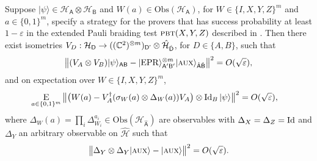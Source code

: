 \documentclass{toc}
\newcommand{\ket}[1]{|#1\rangle}
\newcommand{\Id}{\ensuremath{\mathop{\rm Id}\nolimits}}
\newcommand{\Es}[1]{\ensuremath{\mathop{\textsc{E}}}_{#1}} %
\newcommand{\setft}[1]{\mathrm{#1}}
\newcommand{\Obs}{\setft{Obs}}
\newcommand{\reg}[1]{{\textsf{#1}}}
\newcommand{\mH}{\mathcal{H}}
\newcommand{\eps}{\varepsilon}
\newcommand{\EPR}{{\rm EPR}}
\newcommand{\pbt}{\textsc{pbt}}
\newcommand{\aux}{\textsc {aux}}
\begin{document}
\begin{lemma}
Suppose $\ket{\psi}\in\mH_\reg{A}\otimes \mH_\reg{B}$ and $W(a) \in \Obs(\mH_\reg{A})$, for $W\in \{I,X,Y,Z\}^m$ and $a\in\{0,1\}^m$, specify a strategy for the provers that has success probability at least $1-\eps$ in the extended Pauli braiding test $\pbt(X,Y,Z)$ described in . 
Then there exist isometries $V_D:\mH_\reg{D} \to ((\C^2)^{\otimes m})_{\reg{D'}}  \otimes \hat{\mH}_{\hat{\reg{D}}}$, for $D\in\{A,B\}$, such that
$$\big\| (V_A \otimes V_B) \ket{\psi}_{\reg{AB}} - \ket{\EPR}_{\reg{A}'\reg{B}'}^{\otimes m} \ket{\aux}_{\hat{\reg{A}}\hat{\reg{B}}} \big\|^2 = O(\sqrt{\eps}),$$
and on expectation over  $W\in \{I,X,Y,Z\}^m$,
\begin{align}\label{eq:test-sigmay-2}
 \Es{a\in\{0,1\}^m} \big\| \big(W(a) -V_A^\dagger (\sigma_W(a) \otimes \Delta_W(a)) V_A\big) \otimes \Id_B \ket{\psi} \big\|^2 &= O(\sqrt{\eps}),
\end{align}
where $\Delta_W(a) = \prod_i \Delta_{W_i}^{a_i} \in \Obs({\mH}_{\hat{\reg{A}}})$ are observables with $\Delta_{X}=\Delta_{Z}=\Id$ and $\Delta_{Y}$ an arbitrary observable on $\hat{\mH}$ such that
	$$ \big\|\Delta_Y \otimes \Delta_Y \ket{\aux} - \ket{\aux} \big\|^2 = O(\sqrt{\eps}).$$
\end{lemma}
\end{document}
